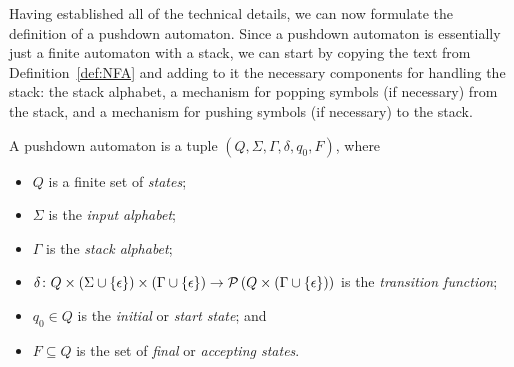 Having established all of the technical details, we can now formulate the definition of a pushdown automaton. Since a pushdown automaton is essentially just a finite automaton with a stack, we can start by copying the text from Definition~\ref{def:NFA} and adding to it the necessary components for handling the stack: the stack alphabet, a mechanism for popping symbols (if necessary) from the stack, and a mechanism for pushing symbols (if necessary) to the stack.

\begin{definition}
A pushdown automaton is a tuple $(Q, \Sigma, \Gamma, \delta, q_{0}, F)$, where
\begin{itemize}
\item $Q$ is a finite set of \emph{states};
\item $\Sigma$ is the \emph{input alphabet};
\item $\Gamma$ is the \emph{stack alphabet};
\item $\delta \colon Q \times (\Sigma \cup \{\epsilon\}) \times (\Gamma \cup \{\epsilon\}) \to \mathcal{P}\left(Q \times (\Gamma \cup \{\epsilon\})\right)$ is the \emph{transition function};
\item $q_{0} \in Q$ is the \emph{initial} or \emph{start state}; and
\item $F \subseteq Q$ is the set of \emph{final} or \emph{accepting states}.
\end{itemize}
\end{definition}


